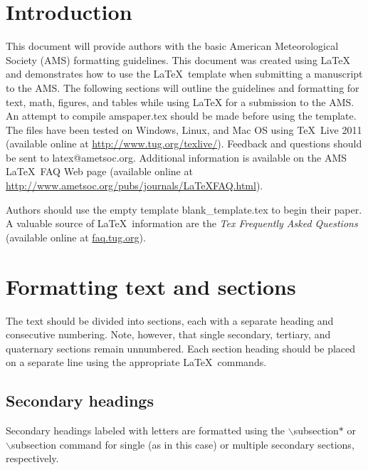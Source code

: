 \documentclass[12pt]{article}
\begin{document}
\section{Introduction}
This document will provide authors with the basic American Meteorological Society (AMS) formatting guidelines. This document was created using \LaTeX\, and demonstrates how to use the \LaTeX\ template when submitting a manuscript to the AMS.  The following sections will outline the guidelines and formatting for text, math, figures, and tables while using \LaTeX\/ for a submission to the AMS. An attempt to compile amspaper.tex should be made before using the template. The files have been tested on Windows, Linux, and  Mac OS using \TeX\ Live 2011 (available online at \url{http://www.tug.org/texlive/}). Feedback and questions should be sent to latex@ametsoc.org. Additional information is available on the AMS \LaTeX\ FAQ Web page (available online at \url{http://www.ametsoc.org/pubs/journals/LaTeXFAQ.html}).

Authors should use the empty template blank\_template.tex to begin their paper. A valuable source of \LaTeX\ information are the \textit{Tex Frequently Asked
Questions} (available online at \url{faq.tug.org}).

\section{Formatting text and sections}
The text should be divided into sections, each with a separate heading and consecutive numbering. Note, however, that single secondary, tertiary, and quaternary sections remain unnumbered. Each section heading should be placed on a separate line using the appropriate \LaTeX\ commands. 

\subsection*{Secondary headings} %
Secondary headings labeled with letters are formatted using the $\backslash$subsection$*$ or $\backslash$subsection command for single (as in this case) or multiple secondary sections, respectively.
\end{document}
